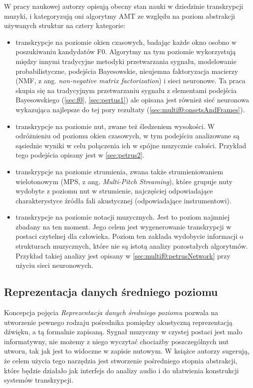 \documentclass[12pt,a4paper,twoside]{mwart}
\begin{document}
W pracy naukowej \cite[3-4]{DBLP:journals/spm/BenetosDDE19} autorzy opisują obecny stan nauki w dziedzinie transkrypcji muzyki, i kategoryzują oni algorytmy AMT ze względu na poziom abstrakcji używanych struktur na cztery kategorie:
\begin{itemize}
  \item transkrypcje na poziomie okien czasowych, badając każde okno osobno w poszukiwaniu kandydatów F0. Algorytmy na tym poziomie wykorzystują między innymi tradycyjne metodyki przetwarzania sygnału, modelowanie probabilistyczne, podejścia Bayesowskie, nieujemna faktoryzacja macierzy (NMF, z ang. \textit{non-negative matrix factorization}) i sieci neuronowe. Ta praca skupia się na tradycyjnym przetwarzaniu sygnału z elementami podejścia Bayesowskiego (\ref{sec:f0}, \ref{sec:pertus1}) ale opisana jest również sieć neuronowa wykazująca najlepsze do tej pory rezultaty (\ref{sec:multif0:onsetsAndFrames}).
  \item transkrypcje na poziomie nut, zwane też śledzeniem wysokości. W odróżnieniu od poziomu okien czasowych, w tym podejściu analizowane są sąsiednie wyniki w celu połączenia ich w spójne muzycznie całości. Przykład tego podejścia opisany jest w \ref{sec:petrus2}.
  \item transkrypcje na poziomie strumienia, zwana także strumieniowaniem wielotonowym (MPS, z ang. \textit{Multi-Pitch Streaming}), które grupuje nuty wydobyte z poziomu nut w strumienie, najczęściej odpowiadające charakterystyce źródła fali akustycznej (odpowiadające instrumentowi).
  \item transkrypcje na poziomie notacji muzycznych. Jest to poziom najmniej zbadany na ten moment. Jego celem jest wygenerowanie transkrypcji w postaci czytelnej dla człowieka. Poziom ten zakłada wydobycie informacji  o strukturach muzycznych, które nie są istotą analizy pozostałych algorytmów. Przykład takiej analizy jest opisany w \ref{sec:multif0:petrusNetwork} przy użyciu sieci neuronowych.
\end{itemize}


\subsection{Reprezentacja danych średniego poziomu}
Koncepcja pojęcia \textit{Reprezentacja danych średniego poziomu} pozwala na utworzenie pewnego rodzaju pośrednika pomiędzy akustyczną reprezentacją dźwięku, a tą formalnie zapisaną. Sygnał muzyczny w czystej postaci jest mało informatywny, nie możemy z niego wyczytać chociażby poszczególnych nut utworu, tak jak jest to widoczne w zapisie nutowym. W książce \cite{Transcription:Zatorre:AuditoryCortex} autorzy sugerują, że celem użycia tego narzędzia jest stworzenie pośredniego stopnia abstrakcji, które będzie działało jak interfejs do analizy audio i do ułatwienia konstrukcji systemów transkrypcji.
\end{document}
